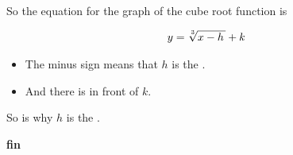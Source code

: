 So the equation for the graph of the  cube root function is 
\begin{tcolorbox}[center,width=2in,colback=blue!10,]
    \vspace{-1.25\onelineskip}
    \begin{align*}
        y = \myRoot[3]{x-h} + k
    \end{align*}
\end{tcolorbox}

\begin{itemize}
    \item The minus sign means that $h$ is the . 
    \item And there is    in front of $k$.
\end{itemize}

\begin{tcolorbox}[center,colback=blue!10,]
    \centering
    So  is why  $h$ is the .
\end{tcolorbox}

\begin{center}
    \LARGE
    \sffamily
    \bfseries
    fin
\end{center}
